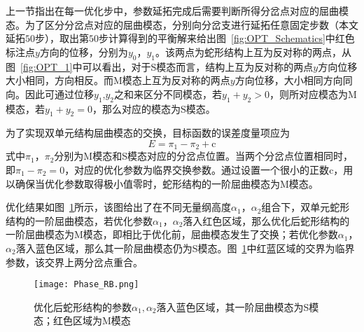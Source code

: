 上一节指出在每一优化步中，参数延拓完成后需要判断所得分岔点对应的屈曲模态。为了区分分岔点对应的屈曲模态，分别向分岔支进行延拓任意固定步数（本文延拓$50$步），取出第$50$步计算得到的平衡解来给出图~\ref{fig:OPT_Schematics}中红色标注点$y$方向的位移，分别为$y_0$，$y_1$。该两点为蛇形结构上互为反对称的两点，从图~\ref{fig:OPT_1}中可以看出，对于S模态而言，结构上互为反对称的两点$y$方向位移大小相同，方向相反。而M模态上互为反对称的两点$y$方向位移，大小相同方向同向。因此可通过位移$y_1$,$y_2$之和来区分不同模态，若$y_1+y_2>0$，则所对应模态为M模态，若$y_1+y_2=0$，那么对应的模态为S模态。

为了实现双单元结构屈曲模态的交换，目标函数的误差度量项应为
\begin{equation}
	E=\pi_{1}-\pi_{2}+\mathrm{c}
	\label{eq:Error term2}
\end{equation}
式中$\pi_{1}$，$\pi_{2}$分别为M模态和S模态对应的分岔点位置。当两个分岔点位置相同时，即$\pi_{1}-\pi_{2}=0$，对应的优化参数为临界交换参数。通过设置一个很小的正数$\mathrm{c}$，用以确保当优化参数取得极小值零时，蛇形结构的一阶屈曲模态为M模态。

优化结果如图~\ref{fig:Phase_RB}所示，该图给出了在不同无量纲高度$\alpha_1$，$\alpha_2$组合下，双单元蛇形结构的一阶屈曲模态，若优化参数$\alpha_1$，$\alpha_2$落入红色区域，那么优化后蛇形结构的一阶屈曲模态为M模态，即相比于优化前，屈曲模态发生了交换；若优化参数$\alpha_1$，$\alpha_2$落入蓝色区域，那么其一阶屈曲模态仍为S模态。图~\ref{fig:Phase_RB}中红蓝区域的交界为临界参数，该交界上两分岔点重合。
\begin{figure}
	\centering
	\texttt{[image: Phase\_RB.png]}
	\caption{优化后蛇形结构的参数$\alpha_1,\alpha_2$落入蓝色区域，其一阶屈曲模态为S模态；红色区域为M模态}
	\label{fig:Phase_RB}
\end{figure}

